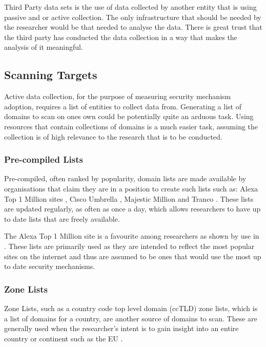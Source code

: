 \documentclass{mscreport}
\begin{document}
\vspace{0.3cm} \noindent
Third Party data sets is the use of data collected by another entity that is using passive and or active collection. The only infrastructure that should be needed by the researcher would be that needed to analyse the data. There is great trust that the third party has conducted the data collection in a way that makes the analysis of it meaningful.

\subsection{Scanning Targets}
Active data collection, for the purpose of measuring security mechanism adoption, requires a list of entities to collect data from. Generating a list of domains to scan on ones own could be potentially quite an arduous task. Using resources that contain collections of domains is a much easier task, assuming the collection is of high relevance to the research that is to be conducted.

\subsubsection{Pre-compiled Lists}
\label{subsubsec:precomplied_lists}

Pre-compiled, often ranked by popularity, domain lists are made available by organisations that claim they are in a position to create such lists such as: Alexa Top 1 Million sites \cite{noauthor_undated-wh}, Cisco Umbrella \cite{noauthor_undated-ku}, Majestic Million \cite{noauthor_undated-sz} and Tranco \cite{noauthor_undated-mt}. These lists are updated regularly, as often as once a day, which allows researchers to have up to date lists that are freely available.

\vspace{0.3cm} \noindent
The Alexa Top 1 Million site is a favourite among researchers as shown by use in \cite{Buchanan2018-xz,Chen2016-dl,Kumar2017-qw,Patil2017-bg,Ying2016-ag,Michael2015-hn,Van_Goethem2014-ao,Holz2020-ha,Poteat2021-zr}. These lists are primarily used as they are intended to reflect the most popular sites on the internet and thus are assumed to be ones that would use the most up to date security mechanisms.

\subsubsection{Zone Lists}

Zone Lists, such as a country code top level domain (ccTLD) zone lists, which is a list of domains for a country, are another source of domains to scan. These are generally used when the researcher's intent is to gain insight into an entire country or continent such as the EU \cite{Amann2017-co,Chen2016-dl,Van_Goethem2014-ao,Holz2020-ha}.
\end{document}
